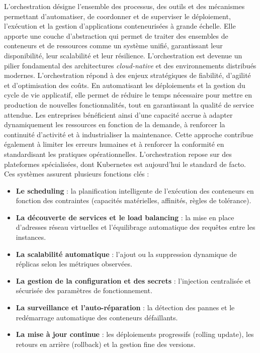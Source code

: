 L’orchestration désigne l’ensemble des processus, des outils et des mécanismes permettant d’automatiser, de coordonner et de superviser le déploiement, l’exécution et la gestion d’applications conteneurisées à grande échelle. Elle apporte une couche d’abstraction qui permet de traiter des ensembles de conteneurs et de ressources comme un système unifié, garantissant leur disponibilité, leur scalabilité et leur résilience. L’orchestration est devenue un pilier fondamental des architectures \textit{cloud-native} et des environnements distribués modernes.
L’orchestration répond à des enjeux stratégiques de fiabilité, d’agilité et d’optimisation des coûts. En automatisant les déploiements et la gestion du cycle de vie applicatif, elle permet de réduire le temps nécessaire pour mettre en production de nouvelles fonctionnalités, tout en garantissant la qualité de service attendue. Les entreprises bénéficient ainsi d’une capacité accrue à adapter dynamiquement les ressources en fonction de la demande, à renforcer la continuité d’activité et à industrialiser la maintenance. Cette approche contribue également à limiter les erreurs humaines et à renforcer la conformité en standardisant les pratiques opérationnelles.
L’orchestration repose sur des plateformes spécialisées, dont Kubernetes est aujourd’hui le standard de facto. Ces systèmes assurent plusieurs fonctions clés :
\begin{itemize}
	\item \textbf{Le scheduling} : la planification intelligente de l’exécution des conteneurs en fonction des contraintes (capacités matérielles, affinités, règles de tolérance).
	\item \textbf{La découverte de services et le load balancing} : la mise en place d’adresses réseau virtuelles et l’équilibrage automatique des requêtes entre les instances.
	\item \textbf{La scalabilité automatique} : l’ajout ou la suppression dynamique de réplicas selon les métriques observées.
	\item \textbf{La gestion de la configuration et des secrets} : l’injection centralisée et sécurisée des paramètres de fonctionnement.
	\item \textbf{La surveillance et l’auto-réparation} : la détection des pannes et le redémarrage automatique des conteneurs défaillants.
	\item \textbf{La mise à jour continue} : les déploiements progressifs (rolling update), les retours en arrière (rollback) et la gestion fine des versions.
\end{itemize}

